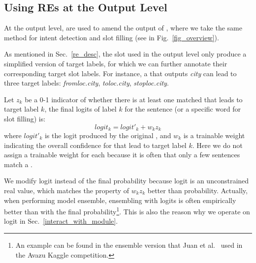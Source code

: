 \subsection{Using REs at the Output Level}
\label{fusion_with_output} At the output level, \REs are used to amend the output of \NNs, where we take the same method for intent
detection and slot filling (see  in Fig.~\ref{fig_overview}).


As mentioned in Sec.~\ref{re_desc}, the slot \REs used in the output level only produce a simplified version of target labels, for which
we can further
annotate their corresponding target slot labels.
For instance, a \RE that outputs \emph{city} can lead to three target labels: \emph{fromloc.city}, \emph{toloc.city},
\emph{stoploc.city}.

Let $z_k$ be a 0-1 indicator of whether there is at least one matched \RE that leads to target label $k$, the final logits
of label $k$ for the sentence (or a specific word for slot filling) is:
\begin{equation}
logit_k = logit'_k + w_k z_k
\end{equation}
where $logit'_k$ is the logit produced by the original \NN, and $w_k$ is a trainable weight indicating the overall confidence for \REs that
lead to target label $k$. Here we do not assign a trainable weight for each \RE because it is often that only a few sentences match a \RE.

We modify logit instead of the final probability because logit is an unconstrained real value, which matches the property of $w_k z_k$ better than probability.
Actually, when performing model ensemble,
ensembling with logits is often empirically better than with the final probability\footnote{
An example can be found in the ensemble version that Juan et al.~ used in the Avazu Kaggle competition.
}.
This is also the reason why we operate on logit %
in Sec.~\ref{interact_with_module}.
